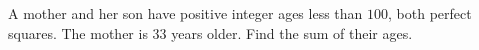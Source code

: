 A mother and her son have positive integer ages less than $100$, both perfect squares. The mother is $33$ years older. Find the sum of their ages.
